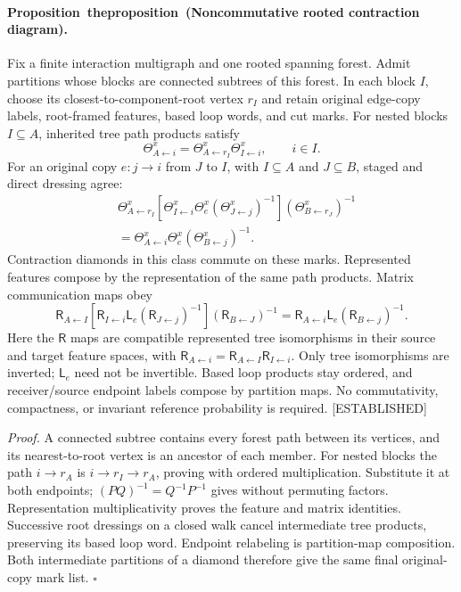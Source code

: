 \documentclass[11pt,letterpaper]{report}
\newcounter{statementsequence}[chapter]
\newcommand{\syncstatementcounter}[1]{\stepcounter{statementsequence}\setcounter{#1}{\numexpr\value{statementsequence}-1\relax}\refstepcounter{#1}}
\newcommand{\resultheading}[4]{\syncstatementcounter{#2}\label{#4}\paragraph{#1~\csname the#2\endcsname\ (#3).}}
\newcommand{\propositionheading}[2]{\resultheading{Proposition}{proposition}{#1}{#2}}
\newcommand{\status}[1]{\mbox{{\small\textsc{\textcolor{red!45!black}{[#1]}}}}}
\begin{document}
\propositionheading{Noncommutative rooted contraction diagram}{prop:sf-boundary-rooted-diagram}
Fix a finite interaction multigraph and one rooted spanning forest. Admit partitions whose blocks are connected subtrees of this forest. In each block $I$, choose its closest-to-component-root vertex $r_I$ and retain original edge-copy labels, root-framed features, based loop words, and cut marks. For nested blocks $I\subseteq A$, inherited tree path products satisfy
\begin{equation}
\Theta^x_{A\leftarrow i}
=\Theta^x_{A\leftarrow r_I}\Theta^x_{I\leftarrow i},
\qquad i\in I.
\label{eq:sf-boundary-tree-composition}
\end{equation}
For an original copy $e:j\to i$ from $J$ to $I$, with $I\subseteq A$ and $J\subseteq B$, staged and direct dressing agree:
\begin{align}
&\Theta^x_{A\leftarrow r_I}
\left[\Theta^x_{I\leftarrow i}\Theta^x_e
(\Theta^x_{J\leftarrow j})^{-1}\right]
(\Theta^x_{B\leftarrow r_J})^{-1}\\
&=
\Theta^x_{A\leftarrow i}\Theta^x_e
(\Theta^x_{B\leftarrow j})^{-1}.
\label{eq:sf-boundary-dressing-diamond}
\end{align}
Contraction diamonds in this class commute on these marks. Represented features compose by the representation of the same path products. Matrix communication maps obey
\[
\mathsf R_{A\leftarrow I}
\left[\mathsf R_{I\leftarrow i}\mathsf L_e
(\mathsf R_{J\leftarrow j})^{-1}\right]
(\mathsf R_{B\leftarrow J})^{-1}
=\mathsf R_{A\leftarrow i}\mathsf L_e
(\mathsf R_{B\leftarrow j})^{-1}.
\]
Here the $\mathsf R$ maps are compatible represented tree isomorphisms in their source and target feature spaces, with $\mathsf R_{A\leftarrow i}=\mathsf R_{A\leftarrow I}\mathsf R_{I\leftarrow i}$. Only tree isomorphisms are inverted; $\mathsf L_e$ need not be invertible. Based loop products stay ordered, and receiver/source endpoint labels compose by partition maps. No commutativity, compactness, or invariant reference probability is required. \status{ESTABLISHED}

\noindent\emph{Proof.}
A connected subtree contains every forest path between its vertices, and its nearest-to-root vertex is an ancestor of each member. For nested blocks the path $i\to r_A$ is $i\to r_I\to r_A$, proving  with ordered multiplication. Substitute it at both endpoints; $(PQ)^{-1}=Q^{-1}P^{-1}$ gives  without permuting factors. Representation multiplicativity proves the feature and matrix identities. Successive root dressings on a closed walk cancel intermediate tree products, preserving its based loop word. Endpoint relabeling is partition-map composition. Both intermediate partitions of a diamond therefore give the same final original-copy mark list. $\square$
\end{document}
